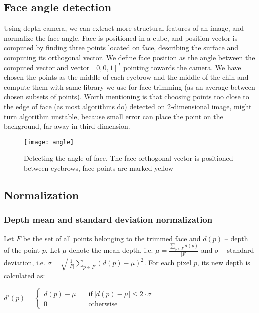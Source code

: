     \subsection{Face angle detection}
    \label{sec:angledetection}
    Using depth camera, we can extract more structural features of an image,
    and normalize the face angle. Face is positioned in a cube, and position vector is computed
    by finding three points located on face, describing the surface
    and computing its orthogonal vector. We define face position
    as the angle between the computed vector and vector $[0,0,1]^T$ pointing towards the camera.
    We have chosen the points as the middle of each eyebrow and the middle of the chin and compute them with
    same library we use for face trimming (as an average between chosen subsets of points). Worth
    mentioning is that choosing points too close to the edge of face (as most algorithms do)
    detected on 2-dimensional image, might turn algorithm unstable, because small error can place the point on the background,
    far away in third dimension.


    \begin{figure}[H]
    \caption{Detecting the angle of face. The face orthogonal vector is positioned between eyebrows, face points are marked yellow}
    \centering
    \texttt{[image: angle]}
    \end{figure}


    \subsection{Normalization}
        \subsubsection*{Depth mean and standard deviation normalization}
        Let $F$ be the set of all points belonging to the trimmed face and
        $d(p)$ -- depth of the point $p$. Let $\mu$ denote the mean depth, i.e.
        $\mu = \frac{\sum\limits_{p \in F}{d(p)}}{|F|}$ and $\sigma$ -- standard
        deviation, i.e. $\sigma = \sqrt{\frac{1}{|F|} \sum\limits_{p \in F}{(d(p) - \mu)^2}}$.
        For each pixel $p$, its new depth is calculated as:

        \begin{center}
        $
          d'(p) = \begin{cases}
                  d(p) - \mu &\quad\text{if}\ |d(p) - \mu| \leqslant 2 \cdot \sigma \\
                  0 &\quad\text{otherwise}
                  \end{cases}
        $
        \end{center}


